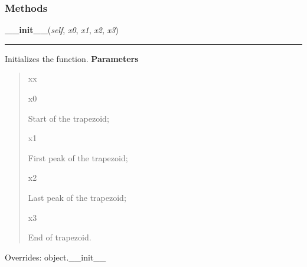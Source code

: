 
  \subsubsection{Methods}

    \vspace{0.5ex}

\hspace{.8\funcindent}\begin{boxedminipage}{\funcwidth}

    \raggedright \textbf{\_\_init\_\_}(\textit{self}, \textit{x0}, \textit{x1}, \textit{x2}, \textit{x3})

    \vspace{-1.5ex}

    \rule{\textwidth}{0.5\fboxrule}
\setlength{\parskip}{2ex}

Initializes the function.
\setlength{\parskip}{1ex}
      \textbf{Parameters}
      \vspace{-1ex}

      \begin{quote}
        \begin{Ventry}{xx}

          \item[x0]


Start of the trapezoid;
          \item[x1]


First peak of the trapezoid;
          \item[x2]


Last peak of the trapezoid;
          \item[x3]


End of trapezoid.
        \end{Ventry}

      \end{quote}

      Overrides: object.\_\_init\_\_

    \end{boxedminipage}

    \vspace{0.5ex}

